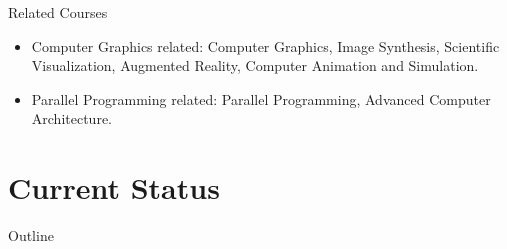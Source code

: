 \documentclass{beamer}
\begin{document}
\begin{frame}{Related Courses}
	\begin{itemize}
		\item Computer Graphics related: Computer Graphics, Image Synthesis, Scientific Visualization, Augmented Reality, Computer Animation and Simulation.
		\item Parallel Programming related: Parallel Programming, Advanced Computer Architecture.
	\end{itemize}
\end{frame}



%


\section{Current Status}

\begin{frame}{Outline}
\end{frame}
\end{document}
